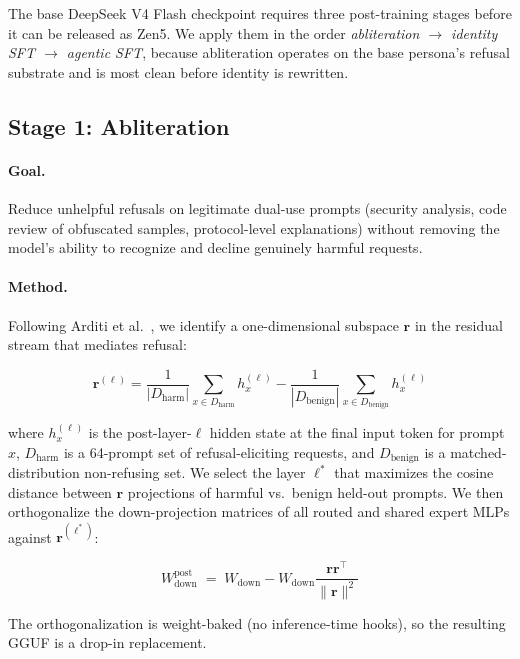 \documentclass[11pt,a4paper]{article}
\begin{document}
The base DeepSeek V4 Flash checkpoint requires three post-training stages before it can be released
as Zen5. We apply them in the order \emph{abliteration $\rightarrow$ identity SFT $\rightarrow$
agentic SFT}, because abliteration operates on the base persona's refusal substrate and is most clean
before identity is rewritten.

\subsection{Stage 1: Abliteration}

\paragraph{Goal.} Reduce unhelpful refusals on legitimate dual-use prompts (security analysis, code
review of obfuscated samples, protocol-level explanations) without removing the model's ability to
recognize and decline genuinely harmful requests.

\paragraph{Method.} Following Arditi et al.\ \cite{arditi2024refusal}, we identify a one-dimensional
subspace $\mathbf{r}$ in the residual stream that mediates refusal:

\begin{equation}
\mathbf{r}^{(\ell)} = \frac{1}{|D_\text{harm}|} \sum_{x \in D_\text{harm}} h^{(\ell)}_x
- \frac{1}{|D_\text{benign}|} \sum_{x \in D_\text{benign}} h^{(\ell)}_x
\end{equation}

where $h^{(\ell)}_x$ is the post-layer-$\ell$ hidden state at the final input token for prompt $x$,
$D_\text{harm}$ is a 64-prompt set of refusal-eliciting requests, and $D_\text{benign}$ is a
matched-distribution non-refusing set. We select the layer $\ell^*$ that maximizes the cosine
distance between $\mathbf{r}$ projections of harmful vs.\ benign held-out prompts. We then orthogonalize
the down-projection matrices of all routed and shared expert MLPs against $\mathbf{r}^{(\ell^*)}$:

\begin{equation}
W_\text{down}^{\text{post}} \;=\; W_\text{down} - W_\text{down} \frac{\mathbf{r}\mathbf{r}^\top}{\|\mathbf{r}\|^2}
\end{equation}

The orthogonalization is weight-baked (no inference-time hooks), so the resulting GGUF is a drop-in
replacement.
\end{document}
